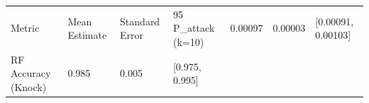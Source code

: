 \begin{tabular}{llll}
\toprule
Metric & Mean Estimate & Standard Error & 95%
\midrule
P_attack (k=10) & 0.00097 & 0.00003 & [0.00091, 0.00103] \\
RF Accuracy (Knock) & 0.985 & 0.005 & [0.975, 0.995] \\
\bottomrule
\end{tabular}

